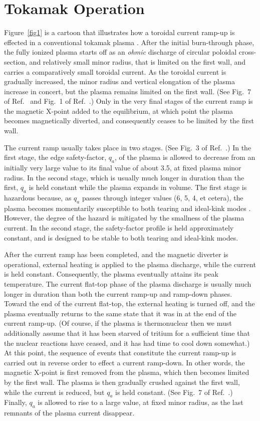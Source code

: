 \documentclass{iopjournal}
\begin{document}
\section{Tokamak Operation}\label{operation}
Figure~\ref{fig1} is a cartoon that illustrates how a toroidal current ramp-up is effected in a conventional tokamak plasma \cite{lister,federici, jackson,politzer}.
After the initial burn-through phase, the fully ionized plasma starts off as an {\em ohmic}\/  discharge of circular poloidal cross-section, and relatively
small minor radius, that is limited on the first wall, and carries a comparatively small toroidal current. As the toroidal current is
gradually increased, the minor radius and vertical elongation of the plasma increase in concert, but the plasma remains limited on
the first wall. (See Fig.~7 of Ref.~\cite{lister} and Fig.~1 of Ref.~\cite{federici}.) Only in the very final stages of the current ramp is the magnetic X-point added to the equilibrium, at which point the
plasma becomes magnetically diverted, and consequently ceases to be limited by the first wall. 

The current ramp usually takes place in two stages.  (See Fig.~3 of Ref.~\cite{creely}.) In the first stage, the edge safety-factor, $q_a$, of the  plasma is allowed to decrease from
an initially very large value to its final value of about 3.5, at fixed plasma minor radius. In the second stage, which is usually much longer in duration than the first, $q_a$ is held constant
while the plasma expands in volume. The first stage is hazardous because, as $q_a$ passes through integer values (6, 5, 4, et cetera), the plasma becomes
momentarily susceptible  to both tearing and ideal-kink modes \cite{wesson,granetz1,cheng}. However, the degree of the hazard is mitigated by the smallness of the plasma current.
In the second stage, the safety-factor profile is  held approximately constant, and is designed to be stable to both tearing and ideal-kink modes. 

After the current ramp has been completed, and the magnetic diverter is operational,  external heating is applied to the plasma discharge, while the  current is held constant.
Consequently, 
the plasma eventually attains its peak temperature. The current flat-top phase of the plasma discharge is usually much longer in duration than both the current ramp-up and ramp-down
phases. Toward the end of the current flat-top, the external heating is turned off, and the plasma eventually returns to the same state that it was in at the end of the
current ramp-up. (Of course, if the plasma is  thermonuclear then we must additionally assume that it has been starved of tritium for a sufficient time that the nuclear reactions
have ceased, and it  has had time to cool down somewhat.)
At this point, the sequence of events that constitute the current ramp-up is carried out in reverse order to effect a current ramp-down. In other words, the magnetic X-point
is first removed from the plasma, which  then becomes limited by the first wall. The plasma is then gradually crushed against the first wall, while the current is reduced, but
$q_a$ is held constant. (See Fig.~7 of Ref.~\cite{lister}.) Finally, $q_a$ is allowed to rise to a large value, at fixed minor radius,  as the last remnants of the plasma current disappear. 
\end{document}
